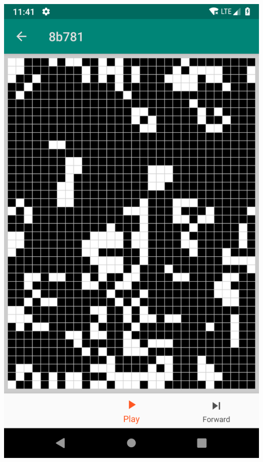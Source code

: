 \documentclass{report}
\begin{document}
\begin{minipage}{.45\textwidth}
\begin{minipage}{.45\linewidth}
    \includegraphics[width=\linewidth]{screens/gameoflife.png}
  \end{minipage}\hfill
\end{minipage} \hfill
\end{document}

